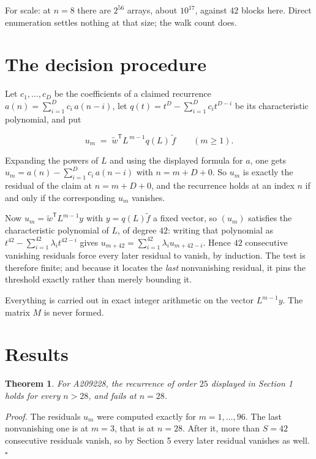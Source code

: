 \documentclass[11pt]{article}
\newtheorem{theorem}{Theorem}
\theoremstyle{definition}
\begin{document}
For scale: at $n = 8$ there are $2^{56}$ arrays, about $10^{17}$, against $42$ blocks here. Direct enumeration settles nothing at that size; the walk count does.

\section{The decision procedure}

Let $c_1,\dots,c_D$ be the coefficients of a claimed recurrence $a(n) = \sum_{i=1}^{D} c_i\,a(n-i)$, let $q(t) = t^{D} - \sum_{i=1}^{D} c_i t^{D-i}$ be its characteristic polynomial, and put

\[u_m \;=\; \tilde w^{\mathsf T} L^{\,m-1} q(L)\,\tilde f \qquad (m \ge 1).\]

Expanding the powers of $L$ and using the displayed formula for $a$, one gets $u_m = a(n) - \sum_{i=1}^{D} c_i\,a(n-i)$ with $n = m + D + 0$. So $u_m$ is exactly the residual of the claim at $n = m + D + 0$, and the recurrence holds at an index $n$ if and only if the corresponding $u_m$ vanishes.

Now $u_m = \tilde w^{\mathsf T} L^{m-1} y$ with $y = q(L)\tilde f$ a fixed vector, so $(u_m)$ satisfies the characteristic polynomial of $L$, of degree $42$: writing that polynomial as $t^{42} - \sum_{i=1}^{42} \lambda_i t^{42-i}$ gives $u_{m+42} = \sum_{i=1}^{42} \lambda_i u_{m+42-i}$. Hence $42$ consecutive vanishing residuals force every later residual to vanish, by induction. The test is therefore finite; and because it locates the {\itshape last} nonvanishing residual, it pins the threshold exactly rather than merely bounding it.

Everything is carried out in exact integer arithmetic on the vector $L^{m-1}y$. The matrix $M$ is never formed.

\section{Results}

\begin{theorem} For A209228, the recurrence of order $25$ displayed in Section 1 holds for every $n > 28$, and fails at $n = 28$.\end{theorem}

{\itshape Proof.} The residuals $u_m$ were computed exactly for $m = 1,\dots,96$. The last nonvanishing one is at $m = 3$, that is at $n = 28$. After it, more than $S = 42$ consecutive residuals vanish, so by Section 5 every later residual vanishes as well. $\square$
\end{document}
